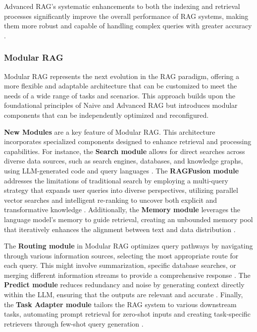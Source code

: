 Advanced RAG’s systematic enhancements to both the indexing and retrieval processes significantly improve the overall performance of RAG systems, making them more robust and capable of handling complex queries with greater accuracy \cite{gao2023retrieval}.

\subsubsection{Modular RAG}

Modular RAG represents the next evolution in the RAG paradigm, offering a more flexible and adaptable architecture that can be customized to meet the needs of a wide range of tasks and scenarios. This approach builds upon the foundational principles of Naive and Advanced RAG but introduces modular components that can be independently optimized and reconfigured.

\textbf{New Modules} are a key feature of Modular RAG. This architecture incorporates specialized components designed to enhance retrieval and processing capabilities. For instance, the \textbf{Search module} allows for direct searches across diverse data sources, such as search engines, databases, and knowledge graphs, using LLM-generated code and query languages \cite{wang2023knowledgpt}. The \textbf{RAGFusion module} addresses the limitations of traditional search by employing a multi-query strategy that expands user queries into diverse perspectives, utilizing parallel vector searches and intelligent re-ranking to uncover both explicit and transformative knowledge \cite{ragfusion2023}. Additionally, the \textbf{Memory module} leverages the language model’s memory to guide retrieval, creating an unbounded memory pool that iteratively enhances the alignment between text and data distribution \cite{cheng2024lift}.

The \textbf{Routing module} in Modular RAG optimizes query pathways by navigating through various information sources, selecting the most appropriate route for each query. This might involve summarization, specific database searches, or merging different information streams to provide a comprehensive response \cite{li2023classification}. The \textbf{Predict module} reduces redundancy and noise by generating context directly within the LLM, ensuring that the outputs are relevant and accurate \cite{yu2022generate}. Finally, the \textbf{Task Adapter module} tailors the RAG system to various downstream tasks, automating prompt retrieval for zero-shot inputs and creating task-specific retrievers through few-shot query generation \cite{cheng2023uprise}.

